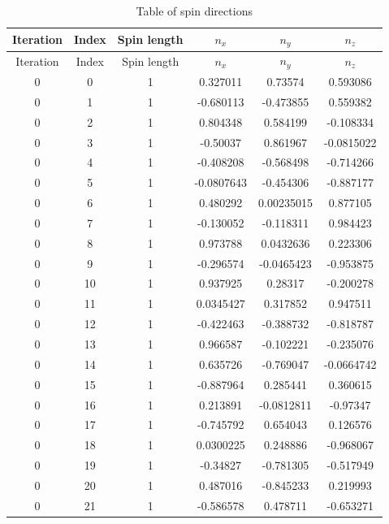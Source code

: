 \documentclass[12pt,a4paper]{article}
\numberwithin{equation}{section}
\numberwithin{figure}{section}
\numberwithin{table}{section}
\begin{document}
	\begin{longtable}{|c|c|c|c|c|c|}
		\caption{Table of spin directions}
		\label{tab:spindirection}\\
		\hline
		Iteration & Index & Spin length & \(n_x\) & \(n_y\) & \(n_z\)\\
		\hline
		\endfirsthead
		
		\hline
		Iteration & Index & Spin length & \(n_x\) & \(n_y\) & \(n_z\)\\
		\hline
		\endhead
		
0 & 0 & 1 & 0.327011 & 0.73574 & 0.593086 \\ \hline
0 & 1 & 1 & -0.680113 & -0.473855 & 0.559382 \\ \hline
0 & 2 & 1 & 0.804348 & 0.584199 & -0.108334 \\ \hline
0 & 3 & 1 & -0.50037 & 0.861967 & -0.0815022 \\ \hline
0 & 4 & 1 & -0.408208 & -0.568498 & -0.714266 \\ \hline
0 & 5 & 1 & -0.0807643 & -0.454306 & -0.887177 \\ \hline
0 & 6 & 1 & 0.480292 & 0.00235015 & 0.877105 \\ \hline
0 & 7 & 1 & -0.130052 & -0.118311 & 0.984423 \\ \hline
0 & 8 & 1 & 0.973788 & 0.0432636 & 0.223306 \\ \hline
0 & 9 & 1 & -0.296574 & -0.0465423 & -0.953875 \\ \hline
0 & 10 & 1 & 0.937925 & 0.28317 & -0.200278 \\ \hline
0 & 11 & 1 & 0.0345427 & 0.317852 & 0.947511 \\ \hline
0 & 12 & 1 & -0.422463 & -0.388732 & -0.818787 \\ \hline
0 & 13 & 1 & 0.966587 & -0.102221 & -0.235076 \\ \hline
0 & 14 & 1 & 0.635726 & -0.769047 & -0.0664742 \\ \hline
0 & 15 & 1 & -0.887964 & 0.285441 & 0.360615 \\ \hline
0 & 16 & 1 & 0.213891 & -0.0812811 & -0.97347 \\ \hline
0 & 17 & 1 & -0.745792 & 0.654043 & 0.126576 \\ \hline
0 & 18 & 1 & 0.0300225 & 0.248886 & -0.968067 \\ \hline
0 & 19 & 1 & -0.34827 & -0.781305 & -0.517949 \\ \hline
0 & 20 & 1 & 0.487016 & -0.845233 & 0.219993 \\ \hline
0 & 21 & 1 & -0.586578 & 0.478711 & -0.653271 \\ \hline

\end{longtable}
\end{document}
